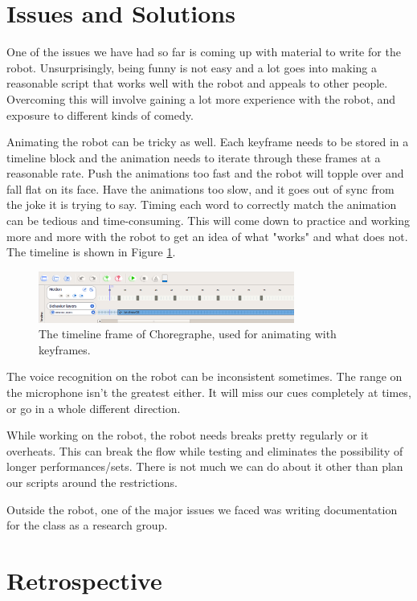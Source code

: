 \documentclass[onecolumn, draftclsnofoot,10pt, compsoc]{IEEEtran}
\begin{document}
\section{Issues and Solutions}
One of the issues we have had so far is coming up with material to write for the robot. Unsurprisingly, being funny is not easy and a lot goes into making a reasonable script that works well with the robot and appeals to other people. Overcoming this will involve gaining a lot more experience with the robot, and exposure to different kinds of comedy.

Animating the robot can be tricky as well. Each keyframe needs to be stored in a timeline block and the animation needs to iterate through these frames at a reasonable rate. Push the animations too fast and the robot will topple over and fall flat on its face. Have the animations too slow, and it goes out of sync from the joke it is trying to say. Timing each word to correctly match the animation can be tedious and time-consuming. This will come down to practice and working more and more with the robot to get an idea of what "works" and what does not. The timeline is shown in Figure \ref{fig:timeline}.

\begin{figure}[H]
  \centering
  \includegraphics[width=0.75\textwidth,height=0.75\textheight,keepaspectratio]{timeline}
  \caption{The timeline frame of Choregraphe, used for animating with keyframes.}
	\label{fig:timeline}
\end{figure}

The voice recognition on the robot can be inconsistent sometimes. The range on the microphone isn't the greatest either. It will miss our cues completely at times, or go in a whole different direction.

While working on the robot, the robot needs breaks pretty regularly or it overheats. This can break the flow while testing and eliminates the possibility of longer performances/sets. There is not much we can do about it other than plan our scripts around the restrictions.

Outside the robot, one of the major issues we faced was writing documentation for the class as a research group.

\section{Retrospective}
\end{document}
